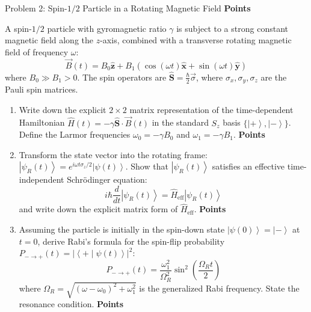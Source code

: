 \documentclass[11pt, a4paper, parskip=half]{scrartcl}
\newcommand{\ket}[1]{\left| #1 \right\rangle}
\newcommand{\braket}[2]{\left\langle #1 \middle| #2 \right\rangle}
\newcommand{\hatop}[1]{\hat{\mathbf{#1}}}
\newcommand{\points}[1]{\hfill{\sffamily\bfseries\color{QMAccent}\lbrack #1 Points\rbrack}}
\begin{document}
\vspace{3mm}

\begin{problembox}{Problem 2: Spin-$1/2$ Particle in a Rotating Magnetic Field \points{35}}

A spin-$1/2$ particle with gyromagnetic ratio $\gamma$ is subject to a strong constant magnetic field along the $z$-axis, combined with a transverse rotating magnetic field of frequency $\omega$:
\[
\vec{B}(t) = B_0 \hat{\mathbf{z}} + B_1 \left( \cos(\omega t)\hat{\mathbf{x}} + \sin(\omega t)\hat{\mathbf{y}} \right)
\]
where $B_0 \gg B_1 > 0$. The spin operators are $\hatop{S} = \frac{\hbar}{2}\vec{\sigma}$, where $\sigma_x, \sigma_y, \sigma_z$ are the Pauli spin matrices.

\begin{enumerate}[label=\bfseries(\alph*), leftmargin=*, itemsep=3pt]
  \item Write down the explicit $2\times 2$ matrix representation of the time-dependent Hamiltonian $\hat{H}(t) = -\gamma \hatop{S} \cdot \vec{B}(t)$ in the standard $S_z$ basis $\{\ket{+}, \ket{-}\}$. Define the Larmor frequencies $\omega_0 = -\gamma B_0$ and $\omega_1 = -\gamma B_1$. \points{10}
  
  \item Transform the state vector into the rotating frame: $\ket{\psi_R(t)} = e^{i \omega t \sigma_z / 2} \ket{\psi(t)}$. Show that $\ket{\psi_R(t)}$ satisfies an effective time-independent Schrödinger equation:
  \[
  i\hbar \frac{d}{dt}\ket{\psi_R(t)} = \hat{H}_{\text{eff}} \ket{\psi_R(t)}
  \]
  and write down the explicit matrix form of $\hat{H}_{\text{eff}}$. \points{13}
  
  \item Assuming the particle is initially in the spin-down state $\ket{\psi(0)} = \ket{-}$ at $t=0$, derive Rabi's formula for the spin-flip probability $P_{-\to+}(t) = |\braket{+}{\psi(t)}|^2$:
  \[
  P_{-\to+}(t) = \frac{\omega_1^2}{\Omega_R^2} \sin^2\left( \frac{\Omega_R t}{2} \right)
  \]
  where $\Omega_R = \sqrt{(\omega - \omega_0)^2 + \omega_1^2}$ is the generalized Rabi frequency. State the resonance condition. \points{12}
\end{enumerate}

\end{problembox}
\end{document}

